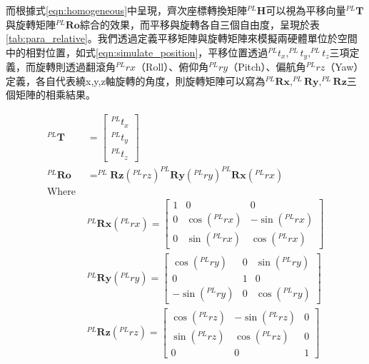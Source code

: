 而根據式\ref{eqn:homogeneous}中呈現，齊次座標轉換矩陣$^{PL}\boldsymbol{H}$可以視為平移向量$^{PL}\boldsymbol{T}$與旋轉矩陣$^{PL}\boldsymbol{Ro}$綜合的效果，而平移與旋轉各自三個自由度，呈現於表\ref{tab:para_relative}。我們透過定義平移矩陣與旋轉矩陣來模擬兩硬體單位於空間中的相對位置，如式\ref{eqn:simulate_position}，平移位置透過$^{PL}t_x,^{PL}t_y,^{PL}t_z$三項定義，而旋轉則透過翻滾角$^{PL}rx$（Roll）、俯仰角$^{PL}ry$（Pitch）、偏航角$^{PL}rz$（Yaw）定義，各自代表繞x,y,z軸旋轉的角度，則旋轉矩陣可以寫為$^{PL}\boldsymbol{Rx},^{PL}\boldsymbol{Ry},^{PL}\boldsymbol{Rz}$三個矩陣的相乘結果。

\begin{equation}
    \label{eqn:simulate_position}
    \begin{aligned}
    ^{PL}\boldsymbol{T} &= 
    \left[\begin{array}{c}
        ^{PL}t_x \\^{PL}t_y\\^{PL}t_z
    \end{array}\right]\\
    ^{PL}\boldsymbol{Ro} &= 
    ^{PL}\boldsymbol{Rz} (^{PL}rz)^{PL}\boldsymbol{Ry}(^{PL}ry) ^{PL}\boldsymbol{Rx} (^{PL}rx)\\
    \text{Where }&\\
    &^{PL}\boldsymbol{Rx} (^{PL}rx) =
    \left[ \begin{array}{ccc}
        1&0&0\\
        0&\cos (^{PL}rx) &-\sin (^{PL}rx) \\
        0&\sin (^{PL}rx) &\cos (^{PL}rx) 
    \end{array}\right] \\
    &^{PL}\boldsymbol{Ry}(^{PL}ry)=
    \left[ \begin{array}{ccc}
        \cos (^{PL}ry) &0&\sin (^{PL}ry) \\
        0&1&0\\
        -\sin (^{PL}ry) &0&\cos (^{PL}ry)
    \end{array}\right]\\
    &^{PL}\boldsymbol{Rz} (^{PL}rz) = 
    \left[ \begin{array}{ccc}
        \cos (^{PL}rz) &-\sin (^{PL}rz)& 0 \\
        \sin (^{PL}rz) &\cos (^{PL}rz)& 0 \\
        0 &0&1
    \end{array}\right]\\
    \end{aligned}
\end{equation}

